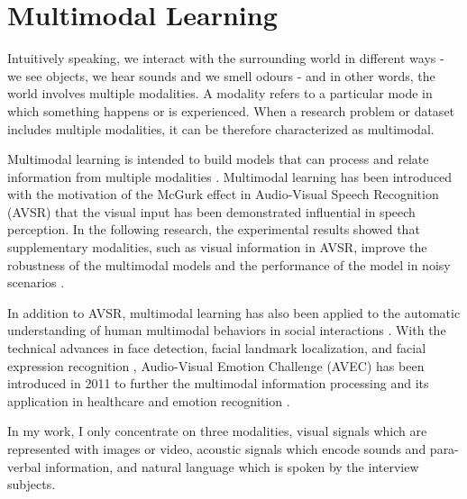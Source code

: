 \section{Multimodal Learning}

Intuitively speaking, we interact with the surrounding world in different ways - we see objects, we hear sounds and we smell odours - and in other words, the world involves multiple modalities. A modality refers to a particular mode in which something happens or is experienced. When a research problem or dataset includes multiple modalities, it can be therefore characterized as multimodal. 


Multimodal learning is intended to build models that can process and relate information from multiple modalities \cite{baltruvsaitis2017}. Multimodal learning has been introduced with the motivation of the McGurk effect \cite{mcgurk1976} in Audio-Visual Speech Recognition (AVSR) that the visual input has been demonstrated influential in speech perception. In the following research, the experimental results showed that supplementary modalities, such as visual information in AVSR, improve the robustness of the multimodal models \cite{gurban2008} and the performance of the model in noisy scenarios \cite{ngiam2011}. 

In addition to AVSR, multimodal learning has also been applied to the automatic understanding of human multimodal behaviors in social interactions \cite{baltruvsaitis2017}. With the technical advances in face detection, facial landmark localization, and facial expression recognition \cite{kanade2005}, Audio-Visual Emotion Challenge (AVEC) has been introduced in 2011 to further the multimodal information processing and its application in healthcare and emotion recognition \cite{schuller2011}.

In my work, I only concentrate on three modalities, visual signals which are represented with images or video, acoustic signals which encode sounds and para-verbal information, and natural language which is spoken by the interview subjects. 